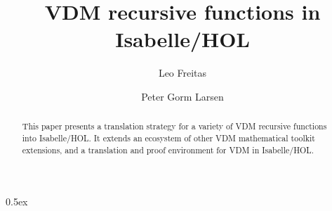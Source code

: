 \documentclass[runningheads,a4paper]{llncs}
\begin{document}
\title{VDM recursive functions in Isabelle/HOL}
\author{Leo Freitas \and Peter Gorm Larsen}

\authorrunning{ }

			
\maketitle
\setcounter{footnote}{0} 
\begin{abstract}
    This paper presents a translation strategy for a variety of VDM recursive functions into Isabelle/HOL.      
    It extends an ecosystem of other VDM mathematical toolkit extensions, and a translation 
    and proof environment for VDM in Isabelle/HOL.
\end{abstract}



\parindent 0pt\parskip 0.5ex




 
\end{document}

